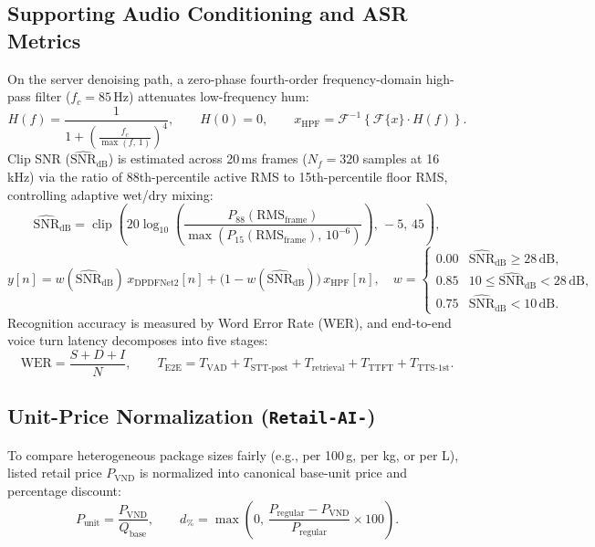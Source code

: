 \subsection*{Supporting Audio Conditioning and ASR Metrics}
On the server denoising path, a zero-phase fourth-order frequency-domain high-pass filter ($f_c = 85\,\text{Hz}$) attenuates low-frequency hum:
\begin{equation}
    H(f) = \frac{1}{1 + \left(\frac{f_c}{\max(f,\,1)}\right)^4}, \qquad H(0) = 0, \qquad x_{\text{HPF}} = \mathcal{F}^{-1}\!\left\{\mathcal{F}\{x\} \cdot H(f)\right\}.
    \label{eq:hpf85}
\end{equation}
Clip SNR ($\widehat{\text{SNR}}_{\text{dB}}$) is estimated across 20\,ms frames ($N_f = 320$ samples at 16\,kHz) via the ratio of 88th-percentile active RMS to 15th-percentile floor RMS, controlling adaptive wet/dry mixing:
\begin{equation}
    \widehat{\text{SNR}}_{\text{dB}} = \operatorname{clip}\!\left(20 \log_{10}\!\left(\frac{P_{88}(\text{RMS}_{\text{frame}})}{\max(P_{15}(\text{RMS}_{\text{frame}}),\,10^{-6})}\right),\,-5,\,45\right),
    \label{eq:snr_est}
\end{equation}
\begin{equation}
    y[n] = w(\widehat{\text{SNR}}_{\text{dB}})\, x_{\text{DPDFNet2}}[n] + \bigl(1 - w(\widehat{\text{SNR}}_{\text{dB}})\bigr)\, x_{\text{HPF}}[n], \quad
    w = \begin{cases}
        0.00 & \widehat{\text{SNR}}_{\text{dB}} \ge 28\,\text{dB}, \\
        0.85 & 10 \le \widehat{\text{SNR}}_{\text{dB}} < 28\,\text{dB}, \\
        0.75 & \widehat{\text{SNR}}_{\text{dB}} < 10\,\text{dB}.
    \end{cases}
    \label{eq:snr_blend}
\end{equation}
Recognition accuracy is measured by Word Error Rate (WER), and end-to-end voice turn latency decomposes into five stages:
\begin{equation}
    \text{WER} = \frac{S + D + I}{N}, \qquad T_{\text{E2E}} = T_{\text{VAD}} + T_{\text{STT-post}} + T_{\text{retrieval}} + T_{\text{TTFT}} + T_{\text{TTS-1st}}.
    \label{eq:wer_latency}
\end{equation}

\subsection*{Unit-Price Normalization (\texttt{Retail-AI-})}
To compare heterogeneous package sizes fairly (e.g., per 100\,g, per kg, or per L), listed retail price $P_{\text{VND}}$ is normalized into canonical base-unit price and percentage discount:
\begin{equation}
    P_{\text{unit}} = \frac{P_{\text{VND}}}{Q_{\text{base}}}, \qquad d_{\%} = \max\!\left(0,\, \frac{P_{\text{regular}} - P_{\text{VND}}}{P_{\text{regular}}} \times 100\right).
    \label{eq:unit_price}
\end{equation}

